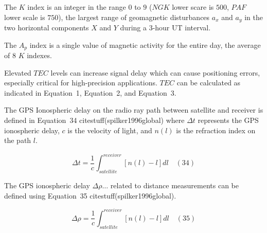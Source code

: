 \documentclass[preprint,12pt]{elsarticle}
\begin{document}
\begin{table}[ht]
    \centering
    \caption{The $K$ index.}
    \label{tab:K}
\end{table}

The $K$ index is an integer in the range $0$ to $9$ ($NGK$ lower scare is $500$, $PAF$ lower scale is $750$), the largest range of geomagnetic disturbances $a_x$ and $a_y$ in the two horizontal components $X$ and $Y$ during a $3$-hour UT interval.

The $A_p$ index is a single value of magnetic activity for the entire day, the average of $8$ $K$ indexes. 
 
Elevated $TEC$ levels can increase signal delay which can cause positioning errors, especially critical for high-precision applications. $TEC$ can be calculated as indicated in Equation~1, Equation~2, and Equation~3. 

The GPS Ionospheric delay on the radio ray path between satellite and receiver is defined in Equation~34 citestuff(spilker1996global) where $\Delta t$ represents the GPS ionospheric delay, $c$ is the velocity of light, and $n(l)$ is the refraction index on the path $l$.

\begin{equation}
	\Delta t = \frac{1}{c} \int_{satellite}^{receiver} \left[ n(l) - l \right]dl
	\quad\left(34\right)
\end{equation}

The GPS ionospheric delay $\Delta \rho \dots$ related to distance measurements can be defined using Equation~35 citestuff(spilker1996global).

\begin{equation}
	\Delta \rho = \frac{1}{c} \int_{satellite}^{receiver} \left[ n(l) - l \right]dl
	\quad\left(35\right)
\end{equation}
\end{document}
